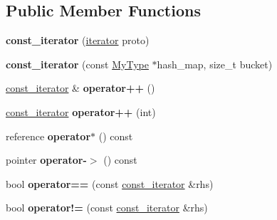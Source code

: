\subsection*{Public Member Functions}
\begin{DoxyCompactItemize}
\item 
\hypertarget{classemlib_1_1_hash_map_1_1const__iterator_a93035081b14db505bc5d15188cead5df}{{\bfseries const\+\_\+iterator} (\hyperlink{classemlib_1_1_hash_map_1_1iterator}{iterator} proto)}\label{classemlib_1_1_hash_map_1_1const__iterator_a93035081b14db505bc5d15188cead5df}

\item 
\hypertarget{classemlib_1_1_hash_map_1_1const__iterator_ab7ce9d5de91c1874f563406226816d53}{{\bfseries const\+\_\+iterator} (const \hyperlink{classemlib_1_1_hash_map}{My\+Type} $\ast$hash\+\_\+map, size\+\_\+t bucket)}\label{classemlib_1_1_hash_map_1_1const__iterator_ab7ce9d5de91c1874f563406226816d53}

\item 
\hypertarget{classemlib_1_1_hash_map_1_1const__iterator_a15491a28e7fe8a3ae23a417965df8edc}{\hyperlink{classemlib_1_1_hash_map_1_1const__iterator}{const\+\_\+iterator} \& {\bfseries operator++} ()}\label{classemlib_1_1_hash_map_1_1const__iterator_a15491a28e7fe8a3ae23a417965df8edc}

\item 
\hypertarget{classemlib_1_1_hash_map_1_1const__iterator_ab6d4721d28c416b570ddbf14b2942060}{\hyperlink{classemlib_1_1_hash_map_1_1const__iterator}{const\+\_\+iterator} {\bfseries operator++} (int)}\label{classemlib_1_1_hash_map_1_1const__iterator_ab6d4721d28c416b570ddbf14b2942060}

\item 
\hypertarget{classemlib_1_1_hash_map_1_1const__iterator_a4dd75ed612587592c82312c5056f9584}{reference {\bfseries operator$\ast$} () const }\label{classemlib_1_1_hash_map_1_1const__iterator_a4dd75ed612587592c82312c5056f9584}

\item 
\hypertarget{classemlib_1_1_hash_map_1_1const__iterator_ae4071cc49406ce74dccb5eff6605cacb}{pointer {\bfseries operator-\/$>$} () const }\label{classemlib_1_1_hash_map_1_1const__iterator_ae4071cc49406ce74dccb5eff6605cacb}

\item 
\hypertarget{classemlib_1_1_hash_map_1_1const__iterator_a67be54e037ae3d667a9e5ad687fae45e}{bool {\bfseries operator==} (const \hyperlink{classemlib_1_1_hash_map_1_1const__iterator}{const\+\_\+iterator} \&rhs)}\label{classemlib_1_1_hash_map_1_1const__iterator_a67be54e037ae3d667a9e5ad687fae45e}

\item 
\hypertarget{classemlib_1_1_hash_map_1_1const__iterator_a6caa572844d4a2bf53a4ccbeeb24e441}{bool {\bfseries operator!=} (const \hyperlink{classemlib_1_1_hash_map_1_1const__iterator}{const\+\_\+iterator} \&rhs)}\label{classemlib_1_1_hash_map_1_1const__iterator_a6caa572844d4a2bf53a4ccbeeb24e441}

\end{DoxyCompactItemize}
